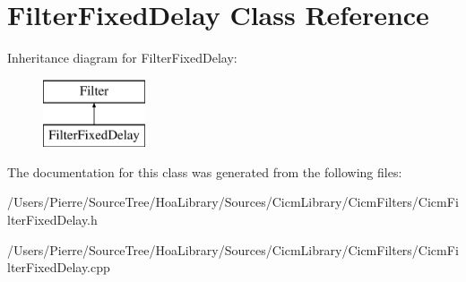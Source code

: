 \hypertarget{class_filter_fixed_delay}{\section{Filter\-Fixed\-Delay Class Reference}
\label{class_filter_fixed_delay}
}
Inheritance diagram for Filter\-Fixed\-Delay\-:\begin{figure}[H]
\begin{center}
\leavevmode
\includegraphics[height=2.000000cm]{class_filter_fixed_delay}
\end{center}
\end{figure}


The documentation for this class was generated from the following files\-:\begin{DoxyCompactItemize}
\item 
/\-Users/\-Pierre/\-Source\-Tree/\-Hoa\-Library/\-Sources/\-Cicm\-Library/\-Cicm\-Filters/Cicm\-Filter\-Fixed\-Delay.\-h\item 
/\-Users/\-Pierre/\-Source\-Tree/\-Hoa\-Library/\-Sources/\-Cicm\-Library/\-Cicm\-Filters/Cicm\-Filter\-Fixed\-Delay.\-cpp\end{DoxyCompactItemize}
